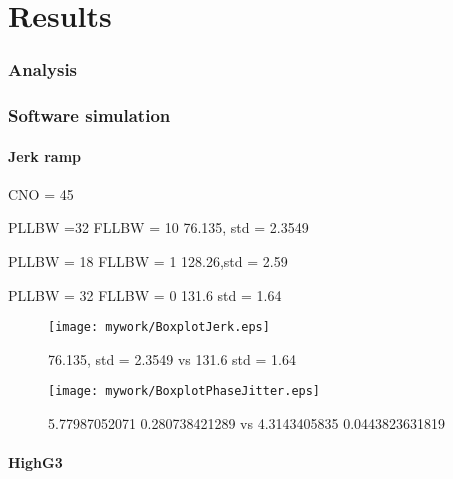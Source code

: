 \chapter{Results}\label{ch:Results}

\subsection{Analysis}

\subsection{Software simulation}

\subsubsection{Jerk ramp}
CNO = 45

PLLBW =32
FLLBW = 10
76.135, std = 2.3549

PLLBW = 18
FLLBW = 1
128.26,std =  2.59 

PLLBW = 32
FLLBW = 0
131.6 std = 1.64

\begin{figure}[!htb] 
    \centering
    \texttt{[image: mywork/BoxplotJerk.eps]} 
    \caption{ 76.135, std = 2.3549 vs 131.6 std = 1.64}
    \label{fig:BoxplotJerk}
\end{figure}

\begin{figure}[!htb] 
    \centering
    \texttt{[image: mywork/BoxplotPhaseJitter.eps]} 
    \caption{5.77987052071 0.280738421289 vs 4.3143405835 0.0443823631819}
    \label{fig:BoxplotPhaseJitter}
\end{figure}

\subsubsection{HighG3}

